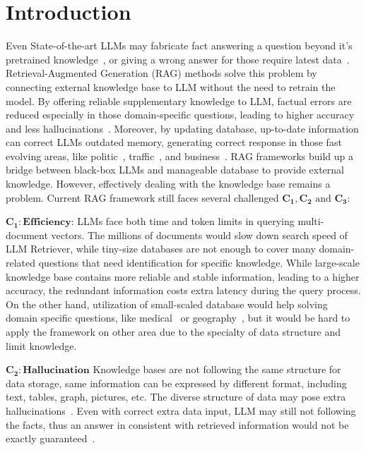 \documentclass[sigconf]{acmart}
\begin{document}
\section{Introduction}
Even State-of-the-art LLMs may fabricate fact answering a question beyond it's pretrained knowledge~\cite{zhang2023siren}, or giving a wrong answer for those require latest data~\cite{kandpal2023large}. Retrieval-Augmented Generation (RAG) methods solve this problem by connecting external knowledge base to LLM without the need to retrain the model. By offering reliable supplementary knowledge to LLM, factual errors are reduced especially in those domain-specific questions, leading to higher accuracy  and less hallucinations~\cite{zhu2021retrieving, gao2023retrieval, zhao2024retrieval}. Moreover, by updating database, up-to-date information can correct LLMs outdated memory, generating correct response in those fast evolving areas, like politic~\cite{arslan2024political, khaliq2024ragar}, traffic~\cite{hussien2025rag}, and business~\cite{arslan2024business, de2024retail}. RAG frameworks build up a bridge between black-box LLMs and manageable database to provide external knowledge. However, effectively dealing with the knowledge base remains a problem. Current RAG framework still faces several challenged $\mathbf{C_1,C_2} \text{ and } \mathbf{C_3}$:


$\mathbf{C_1}:\textbf{Efficiency}$: LLMs face both time and token limits in querying multi-document vectors. The millions of documents would slow down search speed of LLM Retriever, while tiny-size databases are not enough to cover many domain-related questions that need identification for specific knowledge. While large-scale knowledge base contains more reliable and stable information, leading to a higher accuracy, the redundant information costs extra latency during the query process. On the other hand, utilization of small-scaled database would help solving domain specific questions, like medical~\cite{wu2024medical} or geography~\cite{dong2024geo}, but it would be hard to apply the framework on other area due to the specialty of data structure and limit knowledge.


$\mathbf{C_2}:\textbf{Hallucination}$ Knowledge bases are not following the same structure for data storage, same information can be expressed by different format, including text, tables, graph, pictures, etc. The diverse structure of data may pose extra hallucinations~\cite{csakar2025maximizing}. Even with correct extra data input, LLM may still not following the facts, thus an answer in consistent with retrieved information would not be exactly guaranteed~\cite{gao2023enabling}. 
\end{document}
